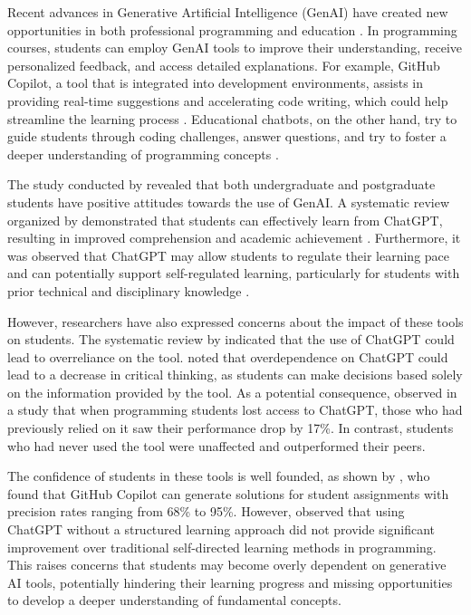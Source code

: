 \documentclass[runningheads]{llncs}
\begin{document}
Recent advances in Generative Artificial Intelligence (GenAI) have created
new opportunities in both professional programming \cite{Peng23}
\cite{Pandey24} and education \cite{Puryear22}. In programming courses,
students can employ GenAI tools to improve their understanding, receive
personalized feedback, and access detailed explanations. For example, GitHub
Copilot, a tool that is integrated into development environments, assists in
providing real-time suggestions and accelerating code writing, which could help
streamline the learning process \cite{Denny23}. Educational chatbots, on the
other hand, try to guide students through coding challenges, answer questions,
and try to foster a deeper understanding of programming concepts
\cite{Labadze23}.

The study conducted by \cite{chan23} revealed that both undergraduate and
postgraduate students have positive attitudes towards the use of GenAI.
A systematic review organized by \cite{Lo24} demonstrated that students can
effectively learn from ChatGPT, resulting in improved comprehension and academic
achievement \cite{Callejo24}. Furthermore, it was observed that ChatGPT may
allow students to regulate their learning pace \cite{Baha24} and can
potentially support self-regulated learning, particularly for students with
prior technical and disciplinary knowledge \cite{Xia23}.

However, researchers have also expressed concerns about the impact of these
tools on students. The systematic review by \cite{Murillo23} indicated that the
use of ChatGPT could lead to overreliance on the tool. \cite{chan23} noted that
overdependence on ChatGPT could lead to a decrease in critical thinking, as
students can make decisions based solely on the information provided by the
tool. As a potential consequence, \cite{Bastani24} observed in a study that when
programming students lost access to ChatGPT, those who had previously relied
on it saw their performance drop by 17\%. In contrast, students who had never
used the tool were unaffected and outperformed their peers.

The confidence of students in these tools is well founded, as shown by
\cite{Puryear22}, who found that GitHub Copilot can generate solutions for
student assignments with precision rates ranging from 68\% to 95\%. However,
\cite{Boudouaia24} observed that using ChatGPT without a structured learning
approach did not provide significant improvement over traditional self-directed
learning methods in programming. This raises concerns that students may become
overly dependent on generative AI tools, potentially hindering their learning
progress and missing opportunities to develop a deeper understanding of
fundamental concepts.
\end{document}
